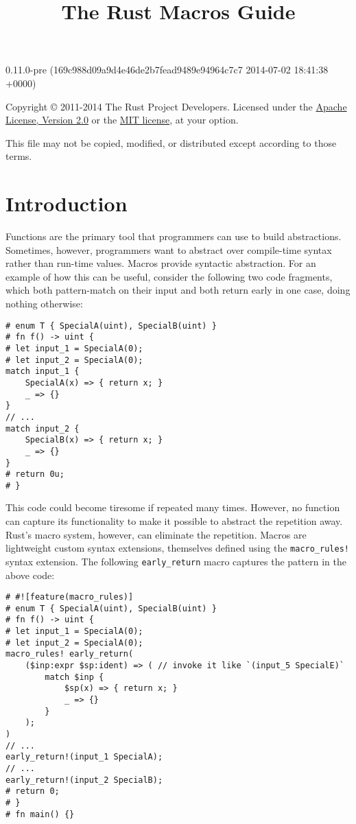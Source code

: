 \documentclass[]{article}
\title{The Rust Macros Guide}
\begin{document}
\maketitle

0.11.0-pre (169c988d09a9d4e46de2b7fead9489e94964c7c7 2014-07-02 18:41:38 +0000)

Copyright © 2011-2014 The Rust Project Developers. Licensed under the
\href{http://www.apache.org/licenses/LICENSE-2.0}{Apache License,
Version 2.0} or the \href{http://opensource.org/licenses/MIT}{MIT
license}, at your option.

This file may not be copied, modified, or distributed except according
to those terms.

{
\hypersetup{linkcolor=black}
\setcounter{tocdepth}{3}
\tableofcontents
}
\section{Introduction}\label{introduction}

Functions are the primary tool that programmers can use to build
abstractions. Sometimes, however, programmers want to abstract over
compile-time syntax rather than run-time values. Macros provide
syntactic abstraction. For an example of how this can be useful,
consider the following two code fragments, which both pattern-match on
their input and both return early in one case, doing nothing otherwise:

\begin{verbatim}
# enum T { SpecialA(uint), SpecialB(uint) }
# fn f() -> uint {
# let input_1 = SpecialA(0);
# let input_2 = SpecialA(0);
match input_1 {
    SpecialA(x) => { return x; }
    _ => {}
}
// ...
match input_2 {
    SpecialB(x) => { return x; }
    _ => {}
}
# return 0u;
# }
\end{verbatim}

This code could become tiresome if repeated many times. However, no
function can capture its functionality to make it possible to abstract
the repetition away. Rust's macro system, however, can eliminate the
repetition. Macros are lightweight custom syntax extensions, themselves
defined using the \texttt{macro\_rules!} syntax extension. The following
\texttt{early\_return} macro captures the pattern in the above code:

\begin{verbatim}
# #![feature(macro_rules)]
# enum T { SpecialA(uint), SpecialB(uint) }
# fn f() -> uint {
# let input_1 = SpecialA(0);
# let input_2 = SpecialA(0);
macro_rules! early_return(
    ($inp:expr $sp:ident) => ( // invoke it like `(input_5 SpecialE)`
        match $inp {
            $sp(x) => { return x; }
            _ => {}
        }
    );
)
// ...
early_return!(input_1 SpecialA);
// ...
early_return!(input_2 SpecialB);
# return 0;
# }
# fn main() {}
\end{verbatim}
\end{document}
